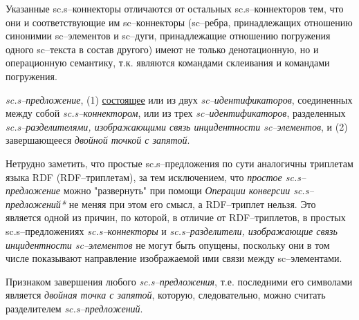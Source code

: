Указанные sc.s--коннекторы отличаются от остальных sc.s--коннекторов тем, что они и соответствующие им sc--коннекторы (sc--ребра, принадлежащих отношению синонимии sc--элементов и sc--дуги, принадлежащие отношению погружения одного sc--текста в состав другого) имеют не только денотационную, но и операционную семантику, т.к. являются командами склеивания и командами погружения.

\begin{SCn}

\end{SCn}

\textit{sc.s--предложение}, (1) \uline{состоящее} или из двух \textit{sc--идентификаторов}, соединенных между собой \textit{\mbox{sc.s--коннектором}}, или из трех \textit{sc--идентификаторов}, разделенных \textit{sc.s--разделителями, изображающими связь инцидентности sc--элементов}, и (2) завершающееся \textit{двойной точкой с запятой}.

Нетрудно заметить, что простые sc.s--предложения по сути аналогичны триплетам языка RDF (\mbox{RDF--триплетам}), за тем исключением, что \textit{простое sc.s--предложение} можно "развернуть"{} при помощи \textit{Операции конверсии sc.s--предложений*} не меняя при этом его смысл, а RDF--триплет нельзя. Это является одной из причин, по которой, в отличие от RDF--триплетов, в простых \mbox{sc.s--предложениях} \textit{\mbox{sc.s--коннекторы}} и \textit{\mbox{sc.s--разделители}, изображающие связь инцидентности \mbox{sc--элементов}} не могут быть опущены, поскольку они в том числе показывают направление изображаемой ими связи между sc--элементами.

Признаком завершения любого \textit{sc.s--предложения}, т.е. последними его символами является \textit{двойная точка с запятой}, которую, следовательно, можно считать разделителем \textit{sc.s--предложений}.


